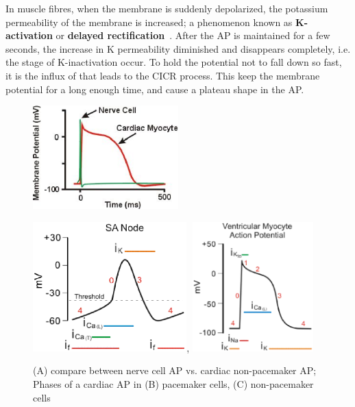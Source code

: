 In muscle fibres, when the membrane is suddenly depolarized, the
potassium permeability of the membrane is increased; a phenomenon
known as {\bf K-activation} \citep{grundfest1961ime} or
{\bf delayed rectification}~\citep{hodgkin1949icu}.  After the AP is
maintained for a few seconds, the increase in K permeability
diminished and disappears completely, i.e. the stage of K-inactivation
occur. To hold the potential not to fall down so fast, it is the
influx of  that leads to the CICR process. This keep the
membrane potential for a long enough time, and cause a plateau shape
in the AP.



\begin{figure}[htb]
  \centerline{\includegraphics[height=4cm]{./images/action_potentials_compare.eps}}
    \centerline{\includegraphics[height=5cm]{./images/pacemaker_AP.eps}, \includegraphics[height=5cm]{./images/ventricular_action_potential.eps}}
    \caption{(A) compare between nerve cell AP vs. cardiac
      non-pacemaker AP; Phases of a cardiac AP in (B) pacemaker cells,
      (C) non-pacemaker cells}\label{fig:cardiac_AP}
\end{figure}


